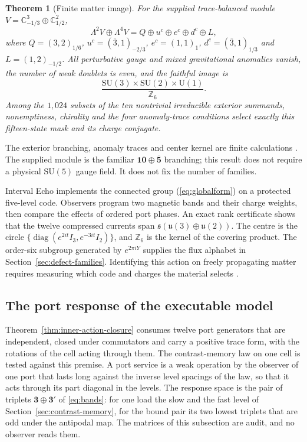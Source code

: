\documentclass[11pt]{article}
\newtheorem{theorem}{Theorem}[section]
\theoremstyle{definition}
\theoremstyle{remark}
\begin{document}
\begin{theorem}[Finite matter image]
\label{thm:matter-image}
For the supplied trace-balanced module
$V=\mathbb C^3_{-1/3}\oplus\mathbb C^2_{1/2}$,
\begin{equation}
 \Lambda^2V\oplus\Lambda^4V
 =Q\oplus u^c\oplus e^c\oplus d^c\oplus L,
\label{eq:generation}
\end{equation}
where $Q=(3,2)_{1/6}$, $u^c=(\bar3,1)_{-2/3}$,
$e^c=(1,1)_1$, $d^c=(\bar3,1)_{1/3}$ and $L=(1,2)_{-1/2}$.
All perturbative gauge and mixed gravitational anomalies vanish, the number
of weak doublets is even, and the faithful image is
\begin{equation}
 \frac{\mathrm{SU}(3)\times\mathrm{SU}(2)\times\mathrm U(1)}{\mathbb Z_6}.
\label{eq:globalform}
\end{equation}
Among the $1{,}024$ subsets of the ten nontrivial irreducible exterior
summands, nonemptiness, chirality and the four anomaly-trace conditions
select exactly this fifteen-state mask and its charge conjugate.
\end{theorem}
The exterior branching, anomaly traces and center kernel are finite
calculations \cite{ophGauge}. The supplied module is the familiar
$\mathbf{10}\oplus\overline{\mathbf5}$ branching; this result does not
require a physical $\mathrm{SU}(5)$ gauge field. It does not fix the
number of families.

Interval Echo implements the connected group (\ref{eq:globalform}) on a
protected five-level code. Observers program two magnetic bands and their
charge weights, then compare the effects of ordered port phases. An exact
rank certificate shows that the twelve compressed currents span
$\mathfrak{s}(\mathfrak u(3)\oplus\mathfrak u(2))$. The centre is the
circle $\{\operatorname{diag}(e^{2it}I_3,e^{-3it}I_2)\}$, and
$\mathbb Z_6$ is the kernel of the covering product. The order-six subgroup
generated by $e^{2\pi iY}$ supplies the flux alphabet in
Section~\ref{sec:defect-families}. Identifying this action on freely
propagating matter requires measuring which code and charges the material
selects \cite{ophGauge}.

\subsection{The port response of the executable model}
\label{sec:port-response}

Theorem~\ref{thm:inner-action-closure} consumes twelve port generators
that are independent, closed under commutators and carry a positive trace
form, with the rotations of the cell acting through them. The
contrast-memory law on one cell is tested against this premise. A port
service is a weak operation by the observer of one port that lasts long
against the inverse level spacings of the law, so that it acts through its
part diagonal in the levels. The response space is the pair of triplets
$\mathbf 3\oplus\mathbf 3'$ of \eqref{eq:bands}: for one load the slow and
the fast level of Section~\ref{sec:contrast-memory}, for the bound pair
its two lowest triplets that are odd under the antipodal map. The matrices
of this subsection are audit, and no observer reads them.
\end{document}

